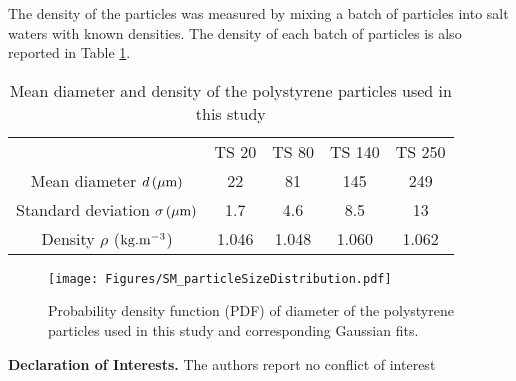 \documentclass{jfm}
\begin{document}
The density of the particles was measured by mixing a batch of particles into salt waters with known densities. The density of each batch of particles is also reported in Table \ref{tab:properties}.

\vspace{5mm}

\begin{table}
\centering
\begin{tabular}{ccccc}
                                          & TS 20 & TS 80 & TS 140 & TS 250 \\
Mean diameter $d\,(\mu{\rm m})$           & 22    & 81    & 145    & 249    \\
Standard deviation $\sigma\,(\mu{\rm m})$ & 1.7   & 4.6   & 8.5    & 13     \\
Density $\rho$ (${\rm kg.m^{-3}}$)        & 1.046 & 1.048 & 1.060  & 1.062 
\end{tabular}
\caption{Mean diameter and density of the polystyrene particles used in this study}
\label{tab:properties}
\end{table}

 \begin{figure}
 \begin{center}
 \texttt{[image: Figures/SM\_particleSizeDistribution.pdf]}%
 \caption{Probability density function (PDF) of diameter of the polystyrene particles used in this study and corresponding Gaussian fits.\label{figure:PDF}}
  \end{center}
 \end{figure}

\bigskip
\noindent \textbf{Declaration of Interests.} The authors report no conflict of interest


 
\end{document}

